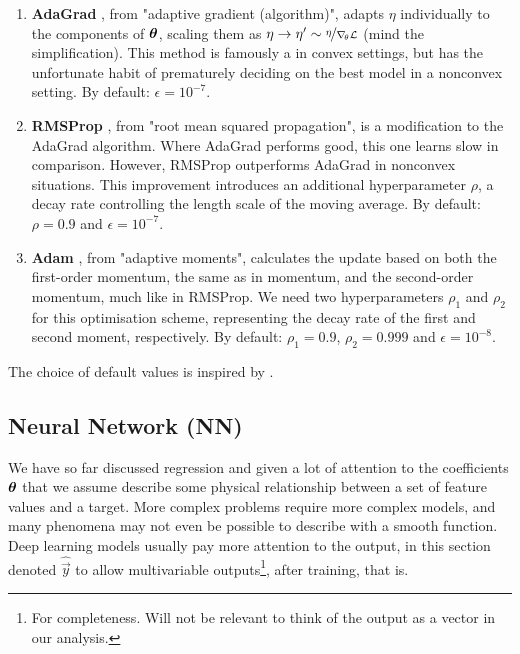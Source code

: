     \begin{enumerate}[leftmargin=0pt,labelwidth=!,labelsep=.05em]
        \item[]\textbf{AdaGrad} \citep[algorithm 8.4]{Goodfellow2016}, from "adaptive gradient (algorithm)", adapts $\eta$ individually to the components of $\boldsymbol{\theta}$, scaling them as $\eta \to \eta' \sim \nicefrac{\eta}{\nabla_{\! \theta} \mathcal{L}}$ (mind the simplification). This method is famously a  in convex settings, but has the unfortunate habit of prematurely deciding on the best model in a nonconvex setting. By default: $\epsilon=10^{-7}$.
        \item[]\textbf{RMSProp} \citep[algorithm 8.5]{Goodfellow2016}, from "root mean squared propagation", is a modification to the AdaGrad algorithm. Where AdaGrad performs good, this one learns slow in comparison. However, RMSProp outperforms AdaGrad in nonconvex situations. This improvement introduces an additional hyperparameter $\rho$, a decay rate controlling the length scale of the moving average. By default: $\rho = 0.9$ and $\epsilon=10^{-7}$.
        \item[]\textbf{Adam} \citep[algorithm 8.7]{Goodfellow2016}, from "adaptive moments", calculates the update based on both the first-order momentum, the same as in momentum, and the second-order momentum, much like in RMSProp. We need two hyperparameters $\rho_1$ and $\rho_2$ for this optimisation scheme, representing the decay rate of the first and second moment, respectively. By default: $\rho_1 = 0.9$, $\rho_2=0.999$ and $\epsilon=10^{-8}$.
    \end{enumerate}
    
    The choice of default values is inspired by \citep[chapter 8.5]{Goodfellow2016}. 

    
    
\subsection{Neural Network (NN)}\label{sec:neural_network}

We have so far discussed regression and given a lot of attention to the coefficients $\boldsymbol{\theta}$ that we assume describe some physical relationship between a set of feature values and a target. More complex problems require more complex models, and many phenomena may not even be possible to describe with a smooth function. Deep learning models usually pay more attention to the output, in this section denoted $\hat{\vec{y}}$ to allow multivariable outputs\footnote{For completeness. Will not be relevant to think of the output as a vector in our analysis.}, after training, that is. 

